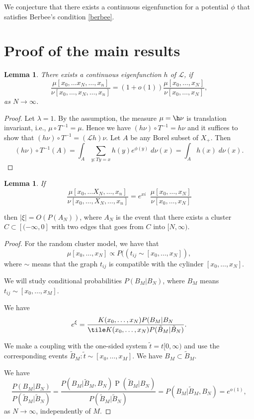 \documentclass[11pt, a4paper, oneside]{article}
\newtheorem{lem}[thm]{Lemma}
\theoremstyle{definition}
\theoremstyle{remark}
\providecommand{\opn}{\operatorname}
\renewcommand{\P}{\mathsf{P}}
\def\P{\opn{P}}
\begin{document}
We conjecture that there exists a continuous eigenfunction for a potential $\phi$ that satisfies Berbee's condition \eqref{berbee}.

\section{Proof of the main results}\noindent
\begin{lem}
There exists a continuous eigenfunction $h$ of ${\mathcal L}$, if
$$\frac{\mu[x_0,\ldots x_N, \ldots, x_n]}{\nu[x_0,\ldots, x_N, \ldots, x_n]}=(1+o(1)) \frac{\mu[x_0,\ldots, x_N]}{\nu[x_0, \ldots, x_N]},$$
as $N\to \infty$.
\end{lem}
\begin{proof}
Let $\lambda=1$. By the assumption, the measure $\mu= \h \nu$ is translation invariant, i.e., $\mu\circ T^{-1}=\mu$. Hence we have $(h\nu)\circ T^{-1}=h\nu$ and it suffices to show that $(h\nu)\circ T^{-1}=({\mathcal L}h)\nu$. Let $A$ be any Borel subset of $X_+$. Then
$$(h\nu)\circ T^{-1} (A)=\int_A \sum_{y: Ty=x} h(y)e^{\phi(y)}\; d\nu(x)=\int_A h(x)\; d\nu(x).$$
\end{proof}

\begin{lem}
If $$\frac{\mu[x_0,\ldots X_N, \ldots, x_n]}{\nu[x_0,\ldots, X_N, \ldots, x_n]}=e^{xi}\; \; \frac{\mu[x_0,\ldots, x_N]}{\nu[x_0, \ldots, x_N]}$$
\end{lem}
then $|\xi|=O(P(A_N))$, where $A_N$ is the event that there exists a cluster $C\subset [(-\infty, 0]$ with two edges that goes from $C$ into $[N,\infty)$.
\begin{proof}
For the random cluster model, we have
that 
$$\mu[x_0,\ldots, x_N]\propto P((t_{ij} \sim [x_0, \ldots, x_N]),$$
where $\sim$ means that the graph $t_{ij}$ is compatible with the cylinder $[x_0,\ldots, x_N]$.

We will study conditional probabilities $P(B_M|B_N)$, where $B_M$ means $t_{ij}\sim [x_0,\ldots, x_M]$.

We have 
$$e^{\xi}=\frac{K(x_0,\ldots, x_N)P(B_M|B_N}{\tile K(x_0,\ldots, x_N)P(\tilde B_M|\tilde B_N)}.$$

We make a coupling with the one-sided system $\tilde t=t[0,\infty)$ and use the corresponding events
$\tilde B_M: \tilde t \sim [x_0,\ldots, x_M]$. We have $B_M\subset \tilde B_M$.

We have
$$ 
\frac{P(B_M|B_N)}{P(\tilde B_M| \tilde B_N)}= 
\frac{P(B_M|\tilde B_M, B_N) \P(\tilde B_M|B_N)}
{P(\tilde B_M|\tilde B_N)}=P(B_M|\tilde B_M, B_N)=e^{o(1)},
$$
as $N\to \infty$, independently of $M$.
\end{proof}
\end{document}
